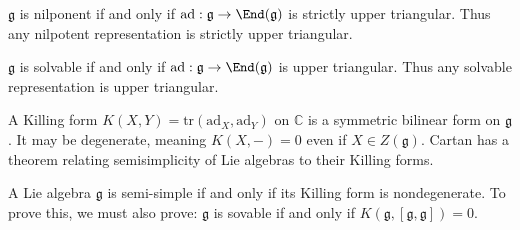 
\begin{theorem}[Engel]\label{thm:hi}
	$\mathfrak{g} $ is nilponent if and only if $\mathrm{ad} : \mathfrak{g}  \to \End(\mathfrak{g} ) $ is strictly upper triangular. Thus any nilpotent representation is strictly upper triangular.
\end{theorem}
\begin{theorem}[Lie]\label{thm:Lie}
	$\mathfrak{g} $ is solvable if and only if $\mathrm{ad} : \mathfrak{g}  \to \End(\mathfrak{g} ) $ is upper triangular. Thus any solvable representation is upper triangular.
\end{theorem}

A Killing form $K(X,Y) = \mathrm{tr} (\mathrm{ad}_X, \mathrm{ad} _Y)$ on $\mathbb{C} $ is a symmetric bilinear form on $\mathfrak{g} $. It may be degenerate, meaning $K(X,-)=0$ even if $X\in Z(\mathfrak{g} )$. Cartan has a theorem relating semisimplicity of Lie algebras to their Killing forms.

\begin{theorem}[Cartan]\label{thm:waow}
	A Lie algebra $\mathfrak{g} $ is semi-simple if and only if its Killing form is nondegenerate. To prove this, we must also prove: $\mathfrak{g} $ is sovable if and only if $K(\mathfrak{g} ,[\mathfrak{g} ,\mathfrak{g} ])=0$.
\end{theorem}
